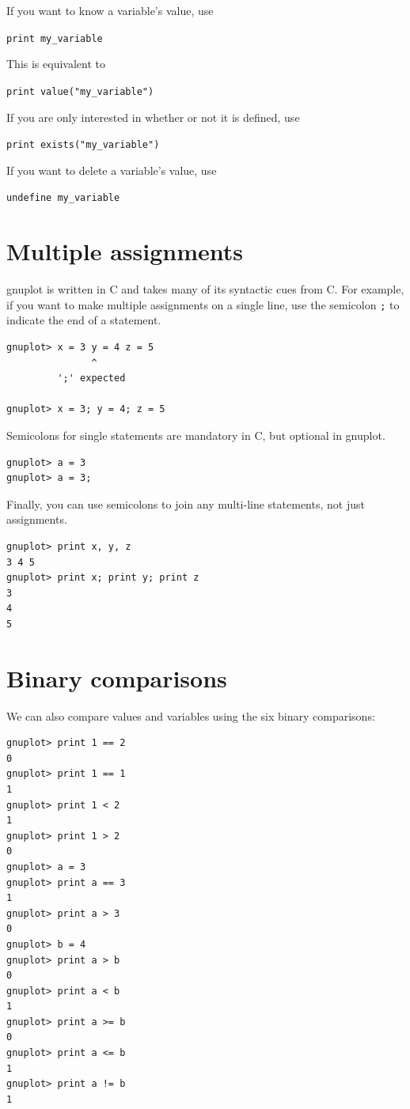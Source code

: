 \documentclass[11pt,letterpaper]{report}
\begin{document}
\noindent If you want to know a variable's value, use

\verb+print my_variable+

\noindent This is equivalent to

\verb+print value("my_variable")+

\noindent If you are only interested in whether or not it is defined, use

\verb+print exists("my_variable")+

If you want to delete a variable's value, use

\verb+undefine my_variable+

\section{Multiple assignments}

gnuplot is written in C and takes many of its syntactic cues from C. For example, if you want to make multiple assignments on a single line, use the semicolon \verb+;+ to indicate the end of a statement.

\begin{lstlisting}
gnuplot> x = 3 y = 4 z = 5
               ^
         ';' expected

gnuplot> x = 3; y = 4; z = 5
\end{lstlisting}

Semicolons for single statements are mandatory in C, but optional in gnuplot.
\begin{verbatim}
gnuplot> a = 3
gnuplot> a = 3;
\end{verbatim}

Finally, you can use semicolons to join any multi-line statements, not just assignments.

\begin{verbatim}
gnuplot> print x, y, z
3 4 5
gnuplot> print x; print y; print z
3
4
5
\end{verbatim}

\section{Binary comparisons}
We can also compare values and variables using the six binary comparisons:
\begin{lstlisting}
gnuplot> print 1 == 2
0
gnuplot> print 1 == 1
1
gnuplot> print 1 < 2
1
gnuplot> print 1 > 2
0
gnuplot> a = 3
gnuplot> print a == 3
1
gnuplot> print a > 3
0
gnuplot> b = 4
gnuplot> print a > b
0
gnuplot> print a < b
1
gnuplot> print a >= b
0
gnuplot> print a <= b
1
gnuplot> print a != b
1
\end{lstlisting}
\end{document}
